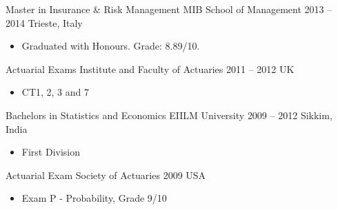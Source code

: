 \documentclass[a4paper,]{fortysecondscv}
\begin{document}



\begin{cvtable}%
    \vspace{\topsep}
    \cvitemoneblock
    {Master in Insurance \& Risk Management}
    {MIB School of Management}
    {2013 -- 2014}
    {Trieste, Italy}
    {
        \begin{itemize}[nosep, leftmargin=12pt, label={-}] %
            \item Graduated with Honours. Grade: 8.89/10.
        \end{itemize}
    }
    \vspace{\topsep}
    \cvitemoneblock
    {Actuarial Exams}
    {Institute and Faculty of Actuaries}
    {2011 -- 2012}
    {UK}
    {
        \begin{itemize}[nosep, leftmargin=12pt, label={-}]
            \item CT1, 2, 3 and 7
        \end{itemize}
    }

    \vspace{\topsep}
    \cvitemoneblock
    {Bachelors in Statistics and Economics}
    {EIILM University}
    {2009 -- 2012}
    {Sikkim, India}
    {
        \begin{itemize}[nosep, leftmargin=12pt, label={-}]
            \item First Division
        \end{itemize}
    }

    \vspace{\topsep}
    \cvitemoneblock
    {Actuarial Exam}
    {Society of Actuaries}
    {2009}
    {USA}
    {
        \vspace{-\topsep}
        \begin{itemize}[nosep, leftmargin=12pt, label={-}]
            \item Exam P - Probability, Grade 9/10
        \end{itemize}
    }
\end{cvtable}
\end{document}
